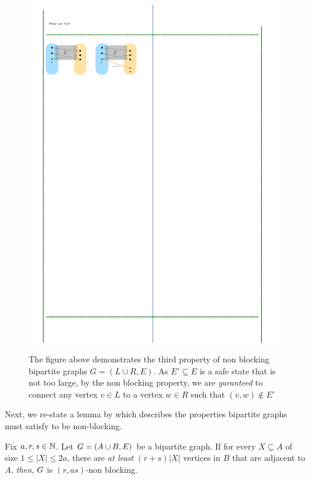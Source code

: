 \documentclass[11pt]{article}
\begin{document}
\begin{figure}[h]
\center
{\caption{The figure above demonstrates the third property of non blocking bipartite graphs $G=(L\cup R, E)$. As $E' \subseteq E$ is a safe state that is not too large, by the non blocking property, we are \emph{guranteed} to connect any vertex $v \in L$ to a vertex $w \in R$ such that $(v,w) \notin E'$}
\label{fig:test}}
{\includegraphics{assets/non-blocking-networks.pdf}}
\end{figure}

Next, we re-state a lemma by \citep[Proposition 1]{feldman1988wide} which describes the properties bipartite graphs must satisfy to be non-blocking.

\begin{lemma}\label{lemma:condtions-for-non-block}
Fix $a, r, s \in \mathbb{N}$. Let $G = (A \cup B, E)$ be a bipartite graph.
If for every $X \subseteq A$ of size $1 \leq |X| \leq 2a$, there are \emph{at least} $(r + s)|X|$ vertices in $B$ that are adjacent to $A$, \emph{then}, $G$ is $(r, as)$-non blocking.
\end{lemma}
\end{document}
